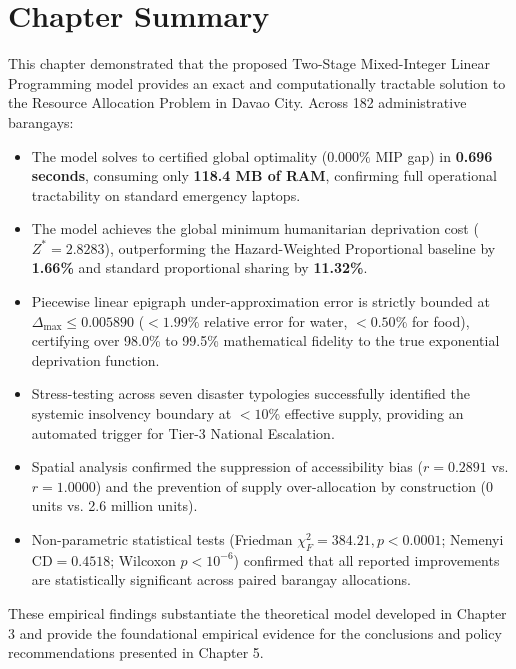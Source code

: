 \section{Chapter Summary}
\label{sec:chapter_summary}

This chapter demonstrated that the proposed Two-Stage Mixed-Integer Linear Programming model provides an exact and computationally tractable solution to the Resource Allocation Problem in Davao City. Across 182 administrative barangays:
\begin{itemize}
    \item The model solves to certified global optimality ($0.000\%$ MIP gap) in \textbf{0.696 seconds}, consuming only \textbf{118.4 MB of RAM}, confirming full operational tractability on standard emergency laptops.
    \item The model achieves the global minimum humanitarian deprivation cost ($Z^* = \mathbf{2.8283}$), outperforming the Hazard-Weighted Proportional baseline by \textbf{1.66\%} and standard proportional sharing by \textbf{11.32\%}.
    \item Piecewise linear epigraph under-approximation error is strictly bounded at $\Delta_{\max} \le \mathbf{0.005890}$ ($< 1.99\%$ relative error for water, $< 0.50\%$ for food), certifying over 98.0\% to 99.5\% mathematical fidelity to the true exponential deprivation function.
    \item Stress-testing across seven disaster typologies successfully identified the systemic insolvency boundary at $< 10\%$ effective supply, providing an automated trigger for Tier-3 National Escalation.
    \item Spatial analysis confirmed the suppression of accessibility bias ($r = 0.2891$ vs. $r = 1.0000$) and the prevention of supply over-allocation by construction (0 units vs. 2.6 million units).
    \item Non-parametric statistical tests (Friedman $\chi_F^2 = 384.21, p < 0.0001$; Nemenyi $\text{CD} = 0.4518$; Wilcoxon $p < 10^{-6}$) confirmed that all reported improvements are statistically significant across paired barangay allocations.
\end{itemize}
These empirical findings substantiate the theoretical model developed in Chapter 3 and provide the foundational empirical evidence for the conclusions and policy recommendations presented in Chapter 5.

